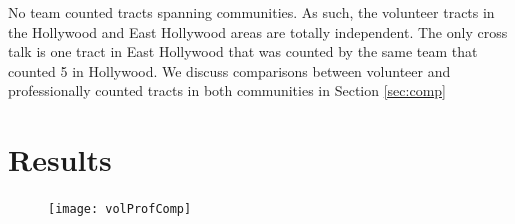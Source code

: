 \documentclass[11pt,twocolumn]{article}
\def\bfr{\bf\color{red}}
\begin{document}
No team counted tracts spanning communities. As such, the volunteer tracts in the Hollywood and
East Hollywood areas are totally independent. The only cross talk is one tract in East Hollywood that
was counted by the same team that counted 5 in Hollywood. We discuss comparisons between
volunteer and professionally counted tracts in both communities in Section \ref{sec:comp} 



%
%


\section{Results}
\label{sec:results}


\begin{figure}[]
	\centering
	\texttt{[image: volProfComp]}
	\caption{}
\end{figure}
\end{document}
